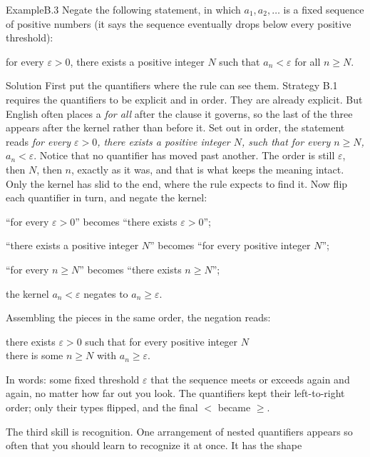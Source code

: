 \documentclass[a4paper,12pt,oneside]{memoir}
\begin{document}
\begin{workedexample}
\begin{envexample}{Example}{B.3}{}
Negate the following statement, in which \(a_1, a_2, \ldots\) is a fixed sequence of positive numbers (it says the sequence eventually drops below every positive threshold):

\begin{centerstatement}
for every \(\varepsilon > 0\), there exists a positive integer \(N\) such that \(a_n < \varepsilon\) for all \(n \ge N\).
\end{centerstatement}
\end{envexample}
\begin{envsolution}{Solution}{}{}
First put the quantifiers where the rule can see them. Strategy B.1 requires the quantifiers to be explicit and in order. They are already explicit. But English often places a \emph{for all} after the clause it governs, so the last of the three appears after the kernel rather than before it. Set out in order, the statement reads \emph{for every \(\varepsilon > 0\), there exists a positive integer \(N\), such that for every \(n \ge N\), \(a_n < \varepsilon\)}. Notice that no quantifier has moved past another. The order is still \(\varepsilon\), then \(N\), then \(n\), exactly as it was, and that is what keeps the meaning intact. Only the kernel has slid to the end, where the rule expects to find it. Now flip each quantifier in turn, and negate the kernel:

\begin{sollist}
  \item “for every \(\varepsilon > 0\)” becomes “there exists \(\varepsilon > 0\)”;
  \item “there exists a positive integer \(N\)” becomes “for every positive integer \(N\)”;
  \item “for every \(n \ge N\)” becomes “there exists \(n \ge N\)”;
  \item the kernel \(a_n < \varepsilon\) negates to \(a_n \ge \varepsilon\).
\end{sollist}
Assembling the pieces in the same order, the negation reads:

\begin{statementblock}
there exists \(\varepsilon > 0\) such that for every positive integer \(N\)\\
there is some \(n \ge N\) with \(a_n \ge \varepsilon\).
\end{statementblock}
In words: some fixed threshold \(\varepsilon\) that the sequence meets or exceeds again and again, no matter how far out you look. The quantifiers kept their left-to-right order; only their types flipped, and the final \(<\) became \(\ge\).
\end{envsolution}
\end{workedexample}
The third skill is recognition. One arrangement of nested quantifiers appears so often that you should learn to recognize it at once. It has the shape
\end{document}
